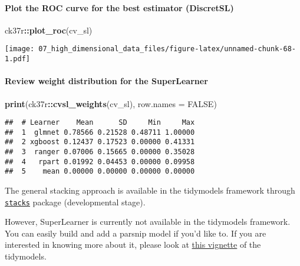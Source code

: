 \documentclass[
]{book}
\newenvironment{Shaded}{\begin{snugshade}}{\end{snugshade}}
\newcommand{\DataTypeTok}[1]{\textcolor[rgb]{0.13,0.29,0.53}{#1}}
\newcommand{\KeywordTok}[1]{\textcolor[rgb]{0.13,0.29,0.53}{\textbf{#1}}}
\newcommand{\NormalTok}[1]{#1}
\newcommand{\OperatorTok}[1]{\textcolor[rgb]{0.81,0.36,0.00}{\textbf{#1}}}
\newcommand{\OtherTok}[1]{\textcolor[rgb]{0.56,0.35,0.01}{#1}}
\begin{document}
\hypertarget{plot-the-roc-curve-for-the-best-estimator-discretsl}{%
\paragraph{Plot the ROC curve for the best estimator (DiscretSL)}\label{plot-the-roc-curve-for-the-best-estimator-discretsl}}

\begin{Shaded}
\begin{Highlighting}[]
\NormalTok{ck37r}\OperatorTok{::}\KeywordTok{plot\_roc}\NormalTok{(cv\_sl)}
\end{Highlighting}
\end{Shaded}

\texttt{[image: 07\_high\_dimensional\_data\_files/figure-latex/unnamed-chunk-68-1.pdf]}

\hypertarget{review-weight-distribution-for-the-superlearner}{%
\paragraph{Review weight distribution for the SuperLearner}\label{review-weight-distribution-for-the-superlearner}}

\begin{Shaded}
\begin{Highlighting}[]
\KeywordTok{print}\NormalTok{(ck37r}\OperatorTok{::}\KeywordTok{cvsl\_weights}\NormalTok{(cv\_sl), }\DataTypeTok{row.names =} \OtherTok{FALSE}\NormalTok{)}
\end{Highlighting}
\end{Shaded}

\begin{verbatim}
##  # Learner    Mean      SD     Min     Max
##  1  glmnet 0.78566 0.21528 0.48711 1.00000
##  2 xgboost 0.12437 0.17523 0.00000 0.41331
##  3  ranger 0.07006 0.15665 0.00000 0.35028
##  4   rpart 0.01992 0.04453 0.00000 0.09958
##  5    mean 0.00000 0.00000 0.00000 0.00000
\end{verbatim}

The general stacking approach is available in the tidymodels framework through \href{https://github.com/tidymodels/stacks}{\texttt{stacks}} package (developmental stage).

However, SuperLearner is currently not available in the tidymodels framework. You can easily build and add a parsnip model if you'd like to. If you are interested in knowing more about it, please look at \href{https://www.tidymodels.org/learn/develop/models/}{this vignette} of the tidymodels.
\end{document}

